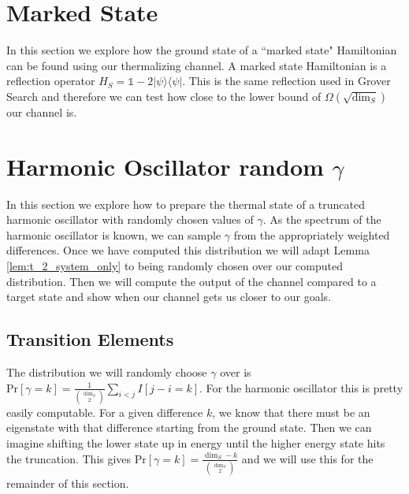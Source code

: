 \documentclass{article}
\newcommand{\ketbra}[2]{| #1\rangle\! \langle #2|}
\newcommand{\prob}[1]{\text{Pr}\left[ #1 \right]}
\newcommand{\identity}{\mathds{1}}
\begin{document}
\section{Marked State}
In this section we explore how the ground state of a ``marked state" Hamiltonian can be found using our thermalizing channel. A marked state Hamiltonian is a reflection operator $H_S = \identity - 2 \ketbra{\psi}{\psi}$. This is the same reflection used in Grover Search and therefore we can test how close to the lower bound of $\Omega(\sqrt{\dim_S})$ our channel is.  

\section{Harmonic Oscillator random $\gamma$}
In this section we explore how to prepare the thermal state of a truncated harmonic oscillator with randomly chosen values of $\gamma$. As the spectrum of the harmonic oscillator is known, we can sample $\gamma$ from the appropriately weighted differences. Once we have computed this distribution we will adapt Lemma \ref{lem:t_2_system_only} to being randomly chosen over our computed distribution. Then we will compute the output of the channel compared to a target state and show when our channel gets us closer to our goals.

\subsection{Transition Elements}
The distribution we will randomly choose $\gamma$ over is $\prob{\gamma = k} = \frac{1}{\binom{\dim_S}{2}} \sum_{i < j} I[j - i = k]$. For the harmonic oscillator this is pretty easily computable. For a given difference $k$, we know that there must be an eigenstate with that difference starting from the ground state. Then we can imagine shifting the lower state up in energy until the higher energy state hits the truncation. This gives $\prob{\gamma = k} = \frac{\dim_S - k}{\binom{\dim_S}{2}}$ and we will use this for the remainder of this section.
\end{document}
